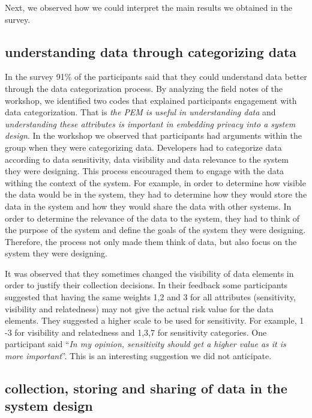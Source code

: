\documentclass{sigchi}
\begin{document}
Next, we observed how we could interpret the main results we obtained in the survey. 

\subsection{understanding data through categorizing data}

In the survey 91\% of the participants said that they could understand data better through the data categorization process. By analyzing the field notes of the workshop, we identified two codes that explained participants engagement with data categorization. That is \textit{the PEM is useful in understanding data} and \textit{understanding these attributes is important in embedding privacy into a system design}. In the workshop we observed that participants had arguments within the group when they were categorizing data. Developers had to categorize data according to data sensitivity, data visibility and data relevance to the system they were designing. This process encouraged them to engage with the data withing the context of the system. For example, in order to determine how visible the data would be in the system, they had to determine how they would store the data in the system and how they would share the data with other systems. In order to determine the relevance of the data to the system, they had to think of the purpose of the system and define the goals of the system they were designing. Therefore, the process not only made them think of data, but also focus on the system they were designing. 

It was observed that they sometimes changed the visibility of data elements in order to justify their collection decisions. In their feedback some participants suggested that having the same weights 1,2 and 3 for all attributes (sensitivity, visibility and relatedness) may not give the actual risk value for the data elements. They suggested a higher scale to be used for sensitivity. For example, 1 -3 for visibility and relatedness and 1,3,7  for sensitivity categories. One participant said \enquote{\textit {In my opinion, sensitivity should get a higher value as it is more important}}. This is an interesting suggestion we did not anticipate. 

\subsection {collection, storing and sharing of data in the system design}
\end{document}
